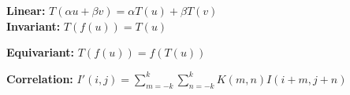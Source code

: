 \textbf{Linear:} $T(\alpha u + \beta v) = \alpha T(u) + \beta T(v)$\\
\textbf{Invariant:} $T(f(u)) = T(u)$\\

\textbf{Equivariant:} $T(f(u)) = f(T(u))$\\

\textbf{Correlation:} $I'(i,j) = \sum_{m = -k}^k \sum_{n	 = -k}^k K(m,n) I(i+m, j+n)$\\

